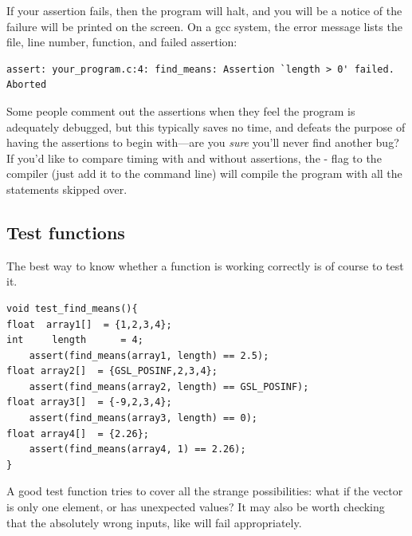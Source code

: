 \documentclass[12pt]{article}
\begin{document}
If your assertion fails, then the program will halt, and you will be
a notice of the failure will be printed on the screen. On a gcc system,
the error message lists the file, line number, function, and failed assertion:
\begin{lstlisting}
assert: your_program.c:4: find_means: Assertion `length > 0' failed.
Aborted
\end{lstlisting}

Some people comment out the assertions when they feel the program is
adequately debugged, but this typically saves no time, and defeats the
purpose of having the assertions to begin with---are you {\em sure}
you'll never find another bug? If you'd like to compare timing with and
without assertions, the - flag to the compiler (just
add it to the command line) will compile the program with all the
 statements skipped over.


\subsection{Test functions} The best way to know whether a
function is working correctly is of course to test it.
\begin{lstlisting}
void test_find_means(){
float  array1[]  = {1,2,3,4};
int     length      = 4;
    assert(find_means(array1, length) == 2.5);
float array2[]  = {GSL_POSINF,2,3,4};
    assert(find_means(array2, length) == GSL_POSINF);
float array3[]  = {-9,2,3,4};
    assert(find_means(array3, length) == 0);
float array4[]  = {2.26};
    assert(find_means(array4, 1) == 2.26);
}
\end{lstlisting}

A good test function tries to cover all the strange possibilities: what
if the vector is only one element, or has unexpected values? It may also
be worth checking that the absolutely wrong inputs, like
 will fail appropriately.
\end{document}
